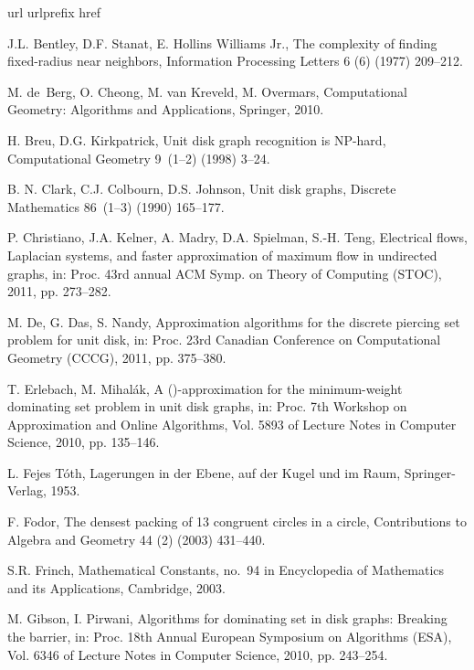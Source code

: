 \documentclass[preprint,12pt]{elsarticle}
\begin{document}
\begin{thebibliography}{10}
\expandafter\ifx\csname url\endcsname\relax
  \def\url#1{\texttt{#1}}\fi
\expandafter\ifx\csname urlprefix\endcsname\relax\def\urlprefix{URL }\fi
\expandafter\ifx\csname href\endcsname\relax
  \def\href#1#2{#2} \def\path#1{#1}\fi

J.L. Bentley, D.F. Stanat, E. Hollins Williams Jr.,
The complexity of finding fixed-radius near neighbors,
Information Processing Letters 6 (6) (1977) 209--212.

M. de~Berg, O. Cheong, M. van Kreveld, M. Overmars, Computational Geometry:
  Algorithms and Applications, Springer, 2010.

H. Breu, D.G. Kirkpatrick, Unit disk graph recognition is NP-hard,
Computational Geometry 9~(1--2) (1998) 3--24.

B. N. Clark, C.J. Colbourn, D.S. Johnson, Unit disk graphs, Discrete
  Mathematics 86~(1--3) (1990) 165--177.

P. Christiano, J.A. Kelner, A. Madry, D.A. Spielman, S.-H. Teng, Electrical
  flows, {L}aplacian systems, and faster approximation of maximum flow in
  undirected graphs, in: Proc. 43rd annual ACM Symp. on Theory of Computing
  (STOC), 2011, pp. 273--282.


M. De, G. Das, S. Nandy, Approximation algorithms for the discrete piercing set
  problem for unit disk, in: Proc. 23rd Canadian Conference on Computational
  Geometry (CCCG), 2011, pp. 375--380.


T. Erlebach, M. Mihal\'{a}k, A ()-approximation for the
  minimum-weight dominating set problem in unit disk graphs, in: Proc. 7th
  Workshop on Approximation and Online Algorithms, Vol. 5893 of Lecture Notes
  in Computer Science, 2010, pp. 135--146.


L. Fejes T\'oth, Lagerungen in der Ebene, auf der Kugel und im Raum,
  Springer-Verlag, 1953.

F. Fodor, The densest packing of 13 congruent circles in a circle,
  Contributions to Algebra and Geometry 44 (2) (2003) 431--440.


S.R. Frinch, Mathematical Constants, no.~94 in Encyclopedia of Mathematics and
  its Applications, Cambridge, 2003.

M. Gibson, I. Pirwani, Algorithms for dominating set in disk graphs: Breaking
  the  barrier, in: Proc. 18th Annual European Symposium on Algorithms
  (ESA), Vol. 6346 of Lecture Notes in Computer Science, 2010, pp. 243--254.


\end{thebibliography}
\end{document}
